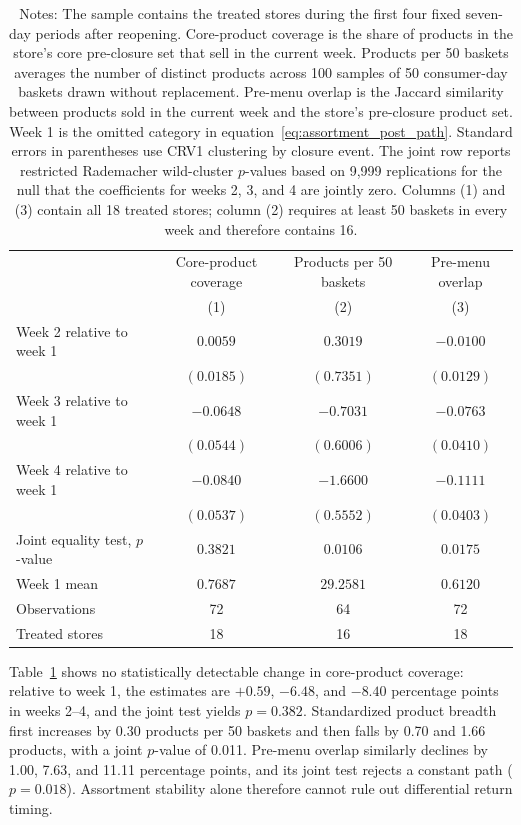 \documentclass[11 pt]{article}
\newcommand\fnote[1]{\captionsetup{font=footnotesize}\caption*{#1}}
\begin{document}
\begin{table}[!ht]
\centering
\caption{Evolution of realized assortment after reopening}
\label{tab:appendix_reopening_assortment_post}
\small
\begin{tabularx}{\textwidth}{Xccc}
\toprule
& Core-product coverage & Products per 50 baskets & Pre-menu overlap \\
& (1) & (2) & (3) \\
\midrule
Week 2 relative to week 1 & $0.0059$ & $0.3019$ & $-0.0100$ \\
& $(0.0185)$ & $(0.7351)$ & $(0.0129)$ \\
Week 3 relative to week 1 & $-0.0648$ & $-0.7031$ & $-0.0763$ \\
& $(0.0544)$ & $(0.6006)$ & $(0.0410)$ \\
Week 4 relative to week 1 & $-0.0840$ & $-1.6600$ & $-0.1111$ \\
& $(0.0537)$ & $(0.5552)$ & $(0.0403)$ \\
\addlinespace
Joint equality test, $p$-value & $0.3821$ & $0.0106$ & $0.0175$ \\
Week 1 mean & $0.7687$ & $29.2581$ & $0.6120$ \\
Observations & 72 & 64 & 72 \\
Treated stores & 18 & 16 & 18 \\
\bottomrule
\end{tabularx}

\vspace{1mm}
\fnote{Notes: The sample contains the treated stores during the first four fixed seven-day periods after reopening. Core-product coverage is the share of products in the store's core pre-closure set that sell in the current week. Products per 50 baskets averages the number of distinct products across 100 samples of 50 consumer-day baskets drawn without replacement. Pre-menu overlap is the Jaccard similarity between products sold in the current week and the store's pre-closure product set. Week 1 is the omitted category in equation~\eqref{eq:assortment_post_path}. Standard errors in parentheses use CRV1 clustering by closure event. The joint row reports restricted Rademacher wild-cluster $p$-values based on 9,999 replications for the null that the coefficients for weeks 2, 3, and 4 are jointly zero. Columns (1) and (3) contain all 18 treated stores; column (2) requires at least 50 baskets in every week and therefore contains 16.}
\end{table}

Table~\ref{tab:appendix_reopening_assortment_post} shows no statistically detectable change in core-product coverage: relative to week 1, the estimates are $+0.59$, $-6.48$, and $-8.40$ percentage points in weeks 2--4, and the joint test yields $p=0.382$. Standardized product breadth first increases by 0.30 products per 50 baskets and then falls by 0.70 and 1.66 products, with a joint $p$-value of 0.011. Pre-menu overlap similarly declines by 1.00, 7.63, and 11.11 percentage points, and its joint test rejects a constant path ($p=0.018$). Assortment stability alone therefore cannot rule out differential return timing.
\end{document}
